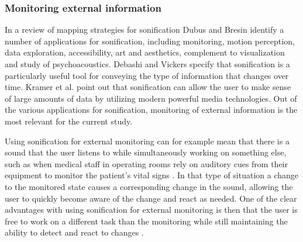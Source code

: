 \documentclass[10pt,a4paper,onecolumn]{article}
\begin{document}
\hypertarget{monitoring-external-information}{%
\subsubsection{Monitoring external information}\label{monitoring-external-information}}

In a review of mapping strategies for sonification Dubus and Bresin \autocite{dubusSystematicReviewMapping2013} identify a number of applications for sonification, including monitoring, motion perception, data exploration, accessibility, art and aesthetics, complement to visualization and study of psychoacoustics. Debashi and Vickers \autocite{debashiSonificationNetworkTraffic2018} specify that sonification is a particularly useful tool for conveying the type of information that changes over time. Kramer et al. \autocite{kramerSonificationReportStatus1999} point out that sonification can allow the user to make sense of large amounts of data by utilizing modern powerful media technologies. Out of the various applications for sonification, monitoring of external information is the most relevant for the current study.

Using sonification for external monitoring can for example mean that there is a sound that the user listens to while simultaneously working on something else, such as when medical staff in operating rooms rely on auditory cues from their equipment to monitor the patient's vital signs \autocite{dubusInteractiveSonificationMotion2013}. In that type of situation a change to the monitored state causes a corresponding change in the sound, allowing the user to quickly become aware of the change and react as needed. One of the clear advantages with using sonification for external monitoring is then that the user is free to work on a different task than the monitoring while still maintaining the ability to detect and react to changes \autocite{vickersSonificationProcessMonitoring2011}.
\end{document}
